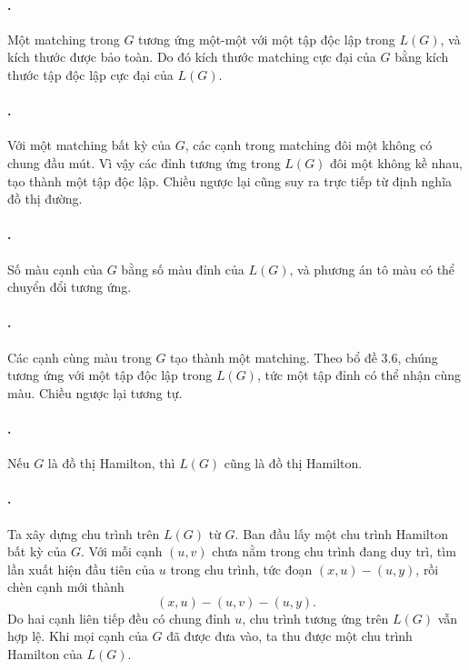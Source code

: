 \documentclass[11pt]{article}
\begin{document}
\paragraph{.}
Một matching trong \(G\) tương ứng một-một với một tập độc lập trong \(L(G)\),
và kích thước được bảo toàn. Do đó kích thước matching cực đại của \(G\) bằng
kích thước tập độc lập cực đại của \(L(G)\).

\paragraph{.}
Với một matching bất kỳ của \(G\), các cạnh trong matching đôi một không có
chung đầu mút. Vì vậy các đỉnh tương ứng trong \(L(G)\) đôi một không kề nhau,
tạo thành một tập độc lập. Chiều ngược lại cũng suy ra trực tiếp từ định nghĩa
đồ thị đường.

\paragraph{.}
Số màu cạnh của \(G\) bằng số màu đỉnh của \(L(G)\), và phương án tô màu có thể
chuyển đổi tương ứng.

\paragraph{.}
Các cạnh cùng màu trong \(G\) tạo thành một matching. Theo bổ đề 3.6, chúng
tương ứng với một tập độc lập trong \(L(G)\), tức một tập đỉnh có thể nhận cùng
màu. Chiều ngược lại tương tự.

\paragraph{.}
Nếu \(G\) là đồ thị Hamilton, thì \(L(G)\) cũng là đồ thị Hamilton.

\paragraph{.}
Ta xây dựng chu trình trên \(L(G)\) từ \(G\). Ban đầu lấy một chu trình
Hamilton bất kỳ của \(G\). Với mỗi cạnh \((u,v)\) chưa nằm trong chu trình đang
duy trì, tìm lần xuất hiện đầu tiên của \(u\) trong chu trình, tức đoạn
\((x,u)-(u,y)\), rồi chèn cạnh mới thành
\[
  (x,u)-(u,v)-(u,y).
\]
Do hai cạnh liên tiếp đều có chung đỉnh \(u\), chu trình tương ứng trên
\(L(G)\) vẫn hợp lệ. Khi mọi cạnh của \(G\) đã được đưa vào, ta thu được một
chu trình Hamilton của \(L(G)\).
\end{document}
